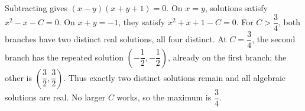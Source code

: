 Subtracting gives $(x-y)(x+y+1)=0$. On $x=y$, solutions satisfy $x^2-x-C=0$. On $x+y=-1$, they satisfy $x^2+x+1-C=0$. For $C>\dfrac{3}{4}$, both branches have two distinct real solutions, all four distinct. At $C=\dfrac{3}{4}$, the second branch has the repeated solution $(-\dfrac{1}{2},-\dfrac{1}{2})$, already on the first branch; the other is $(\dfrac{3}{2},\dfrac{3}{2})$. Thus exactly two distinct solutions remain and all algebraic solutions are real. No larger $C$ works, so the maximum is $\boxed{\dfrac{3}{4}}$.

